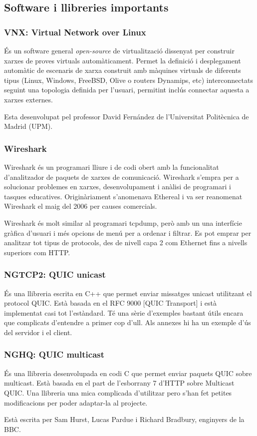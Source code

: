 \subsection{Software i llibreries importants}
\subsubsection{VNX: Virtual Network over Linux}
{
    És un software general \textit{open-source} de virtualització dissenyat per construir xarxes de proves virtuals automàticament. Permet la definició i 
    desplegament automàtic de escenaris de xarxa construit amb màquines virtuals de diferents tipus (Linux, Windows, FreeBSD, Olive o routers Dynamips, etc)
    interconnectats seguint una topologia definida per l'usuari, permitint inclús connectar aquesta a xarxes externes.

    Esta desenvolupat pel professor David Fernández de l'Universitat Politècnica de Madrid (UPM).
}

\subsubsection{Wireshark}
{
    Wireshark és un programari lliure i de codi obert amb la funcionalitat d'analitzador de paquets de xarxes de comunicació. Wireshark s'empra per 
    a solucionar problemes en xarxes, desenvolupament i anàlisi de programari i tasques educatives. Originàriament s'anomenava Ethereal i va ser 
    reanomenat Wireshark el maig del 2006 per causes comercials.

    Wireshark és molt similar al programari tcpdump, però amb un una interfície gràfica d'usuari i més opcions de menú per a ordenar i filtrar. Es pot
    emprar per analitzar tot tipus de protocols, des de nivell capa 2 com Ethernet fins a nivells superiors com HTTP.
}

\subsubsection{NGTCP2: QUIC unicast}
{
    És una llibreria escrita en C++ que permet enviar missatges unicast utilitzant el protocol QUIC. Està basada en el RFC 9000 [QUIC Transport] i està
    implementat casi tot l'estàndard. Té una sèrie d'exemples bastant útils encara que complicats d'entendre a primer cop d'ull. Als annexes hi ha un exemple
    d'ús del servidor i el client.
}

\subsubsection{NGHQ: QUIC multicast}
{
    És una llibreria desenvolupada en codi C que permet enviar paquets QUIC sobre multicast. Està basada en el part de l'esborrany 7 d'HTTP sobre Multicast QUIC.
    Una llibreria una mica complicada d'utilitzar pero s'han fet petites modificacions per poder adaptar-la al projecte.
    
    Està escrita per Sam Hurst, Lucas Pardue i Richard Bradbury, enginyers de la \ac{BBC}.  
}

